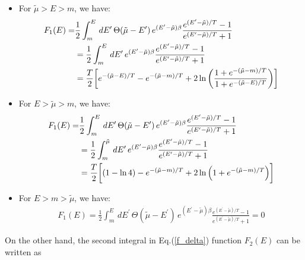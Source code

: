 \documentclass[sn-mathphys,Numbered]{sn-jnl}
\theoremstyle{thmstyleone}%
\theoremstyle{thmstyletwo}%
\theoremstyle{thmstylethree}%
\begin{document}
\begin{itemize}
\item For $\tilde\mu>E>m$, we have:
\begin{align}
F_1(E)=&\frac{1}{2}\int^{E}_{m}\,dE^\prime\,\Theta(\tilde\mu-E^\prime)\,e^{(E^\prime-\tilde\mu)\beta}\frac{e^{(E^\prime-\tilde\mu)/T}-1}{e^{(E^\prime-\tilde\mu)/T}+1}\\&=\frac{1}{2}\int^{E}_{m}\,dE^\prime\,e^{(E^\prime-\tilde\mu)\beta}\frac{e^{(E^\prime-\tilde\mu)/T}-1}{e^{(E^\prime-\tilde\mu)/T}+1}\notag\\
&=\frac{T}{2}\bigg[e^{-(\tilde\mu-E)/T} -e^{-(\tilde\mu-m)/T} + 2\ln{\left(\frac{1+e^{-(\tilde\mu-m)/T}}{1+e^{-(\tilde\mu-E)/T}}\right)}\bigg]
\end{align}
  \item For $E>\tilde\mu>m$, we have:
\begin{align}
F_1(E)=&\frac{1}{2}\int^{E}_{m}\,dE^\prime\,\Theta(\tilde\mu-E^\prime)\,e^{(E^\prime-\tilde\mu)\beta}\frac{e^{(E^\prime-\tilde\mu)/T}-1}{e^{(E^\prime-\tilde\mu)/T}+1}\\&=\frac{1}{2}\int^{\tilde\mu}_{m}\,dE^\prime\,e^{(E^\prime-\tilde\mu)\beta}\frac{e^{(E^\prime-\tilde\mu)/T}-1}{e^{(E^\prime-\tilde\mu)/T}+1}\notag\\
&=\frac{T}{2}\bigg[(1-\ln4)-e^{-(\tilde\mu-m)/T} + 2\ln{\left(1+e^{-(\tilde\mu-m)/T}\right)}\bigg]
\end{align}
  \item For $E>m>\tilde\mu$, we have:
\begin{align}
F_1(E)=\frac{1}{2}\int^{E}_{m}\,dE^\prime\,\Theta(\tilde\mu-E^\prime)\,e^{(E^\prime-\tilde\mu)\beta}\frac{e^{(E^\prime-\tilde\mu)/T}-1}{e^{(E^\prime-\tilde\mu)/T}+1}=0
\end{align}
\end{itemize}
On the other hand, the second integral in Eq.(\ref{f_delta}) function $F_2(E)$ can be written as
\end{document}

